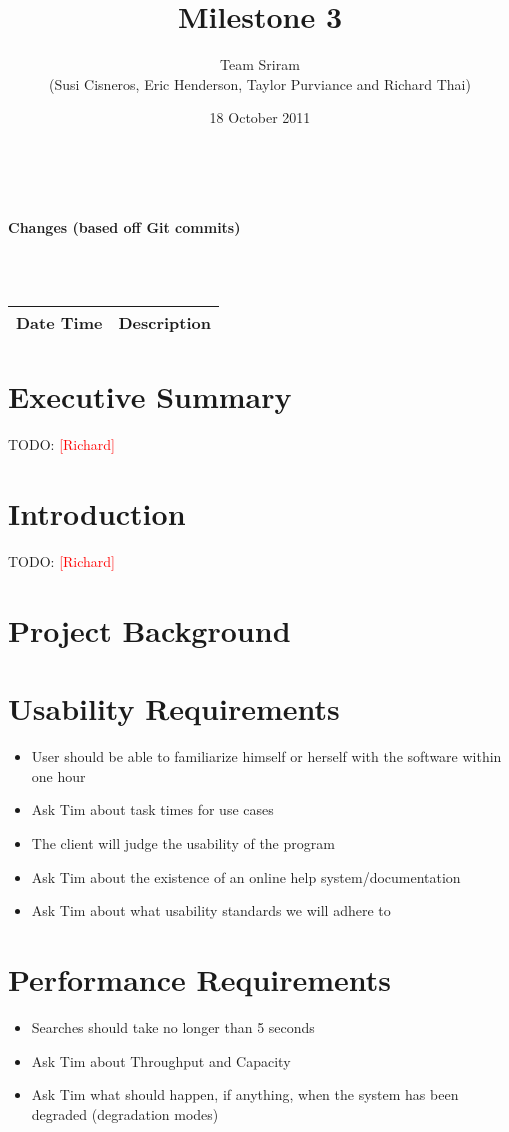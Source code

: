 \documentclass{article}
\newcommand{\richard}{\textcolor{red}{[Richard]}}
\begin{document}
\setlength{\voffset}{3.5in}
\title{Milestone 3}
\author{Team Sriram\\
(Susi Cisneros, Eric Henderson, Taylor Purviance and Richard Thai)}
\date{18 October 2011}
\maketitle
\clearpage
\setlength{\voffset}{0pt}
\tableofcontents
\clearpage
~\\
\begin{Large}\textbf{Changes (based off Git commits)}\end{Large}\\
~\\
\begin{tabular}{ | p{2in} | p{4.5in} | }
\hline
\textbf{Date Time} & \textbf{Description}\\
\hline
\hline
\end{tabular}
\clearpage

\section{Executive Summary}
TODO: \richard

\section{Introduction}
TODO: \richard

\section{Project Background}

\section{Usability Requirements}
\begin{itemize}
\item User should be able to familiarize himself or herself with the software within one hour
\item Ask Tim about task times for use cases
\item The client will judge the usability of the program
\item Ask Tim about the existence of an online help system/documentation
\item Ask Tim about what usability standards we will adhere to
\end{itemize}

\section{Performance Requirements}
\begin{itemize}
\item Searches should take no longer than 5 seconds
\item Ask Tim about Throughput and Capacity
\item Ask Tim what should happen, if anything, when the system has been degraded (degradation modes)
\end{itemize}
\end{document}
